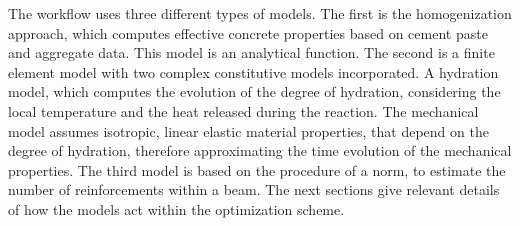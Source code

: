 The workflow uses three different types of models. 
The first is the homogenization approach, which computes effective concrete properties based on cement paste and aggregate data.
This model is an analytical function.
The second is a finite element model with two complex constitutive models incorporated.
A hydration model, which computes the evolution of the degree of hydration, considering the local temperature and the heat released during the reaction.
The mechanical model assumes isotropic, linear elastic material properties, that depend on the degree of hydration, therefore approximating the time evolution of the mechanical properties.
The third model is based on the procedure of a norm, to estimate the number of reinforcements within a beam.
The next sections give relevant details of how the models act within the optimization scheme.